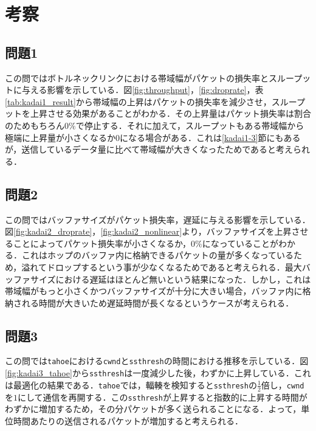 \documentclass[paper=a4, fontsize=10pt]{jlreq}
\begin{document}
\section{考察}

\subsection*{問題1}

この問ではボトルネックリンクにおける帯域幅がパケットの損失率とスループットに与える影響を示している．図\ref{fig:throughput}，\ref{fig:droprate}，表\ref{tab:kadai1_result}から帯域幅の上昇はパケットの損失率を減少させ，スループットを上昇させる効果があることがわかる．その上昇量はパケット損失率は割合のためもちろん$0\%$で停止する．それに加えて，スループットもある帯域幅から極端に上昇量が小さくなるか$0$になる場合がある．これは\ref{kadai1-3}節にもあるが，送信しているデータ量に比べて帯域幅が大きくなったためであると考えられる．

\subsection*{問題2}

この問ではバッファサイズがパケット損失率，遅延に与える影響を示している．図\ref{fig:kadai2_droprate}，\ref{fig:kadai2_nonlinear}より，バッファサイズを上昇させることによってパケット損失率が小さくなるか，$0\%$になっていることがわかる．これはホップのバッファ内に格納できるパケットの量が多くなっているため，溢れてドロップするという事が少なくなるためであると考えられる．最大バッファサイズにおける遅延はほとんど無いという結果になった．しかし，これは帯域幅がもっと小さくかつバッファサイズが十分に大きい場合，バッファ内に格納される時間が大きいため遅延時間が長くなるというケースが考えられる．

\subsection*{問題3}

\label{kadai3}

この問では\texttt{tahoe}における\texttt{cwnd}と\texttt{ssthresh}の時間における推移を示している．図\ref{fig:kadai3_tahoe}から\texttt{ssthresh}は一度減少した後，わずかに上昇している．これは最適化の結果である．\texttt{tahoe}では，輻輳を検知すると\texttt{ssthresh}の$\frac{1}{2}$倍し，\texttt{cwnd}を$1$にして通信を再開する．この\texttt{ssthresh}が上昇すると指数的に上昇する時間がわずかに増加するため，その分パケットが多く送られることになる．よって，単位時間あたりの送信されるパケットが増加すると考えられる．
\end{document}

